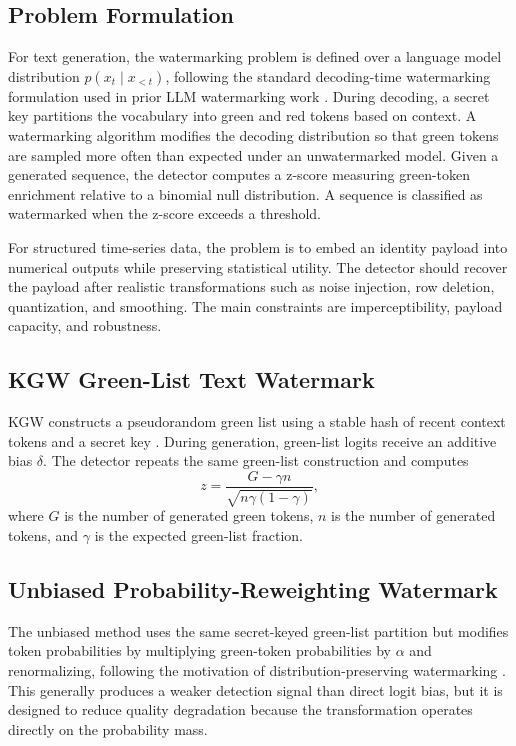 \documentclass[11pt]{article}
\begin{document}
\subsection{Problem Formulation}

For text generation, the watermarking problem is defined over a language model distribution $p(x_t \mid x_{<t})$, following the standard decoding-time watermarking formulation used in prior LLM watermarking work \cite{kirchenbauer2023,kuditipudi2023}.
During decoding, a secret key partitions the vocabulary into green and red tokens based on context.
A watermarking algorithm modifies the decoding distribution so that green tokens are sampled more often than expected under an unwatermarked model.
Given a generated sequence, the detector computes a z-score measuring green-token enrichment relative to a binomial null distribution.
A sequence is classified as watermarked when the z-score exceeds a threshold.

For structured time-series data, the problem is to embed an identity payload into numerical outputs while preserving statistical utility.
The detector should recover the payload after realistic transformations such as noise injection, row deletion, quantization, and smoothing.
The main constraints are imperceptibility, payload capacity, and robustness.

\subsection{KGW Green-List Text Watermark}

KGW constructs a pseudorandom green list using a stable hash of recent context tokens and a secret key \cite{kirchenbauer2023}.
During generation, green-list logits receive an additive bias $\delta$.
The detector repeats the same green-list construction and computes
\[
z = \frac{G - \gamma n}{\sqrt{n\gamma(1-\gamma)}},
\]
where $G$ is the number of generated green tokens, $n$ is the number of generated tokens, and $\gamma$ is the expected green-list fraction.

\subsection{Unbiased Probability-Reweighting Watermark}

The unbiased method uses the same secret-keyed green-list partition but modifies token probabilities by multiplying green-token probabilities by $\alpha$ and renormalizing, following the motivation of distribution-preserving watermarking \cite{kuditipudi2023}.
This generally produces a weaker detection signal than direct logit bias, but it is designed to reduce quality degradation because the transformation operates directly on the probability mass.
\end{document}
